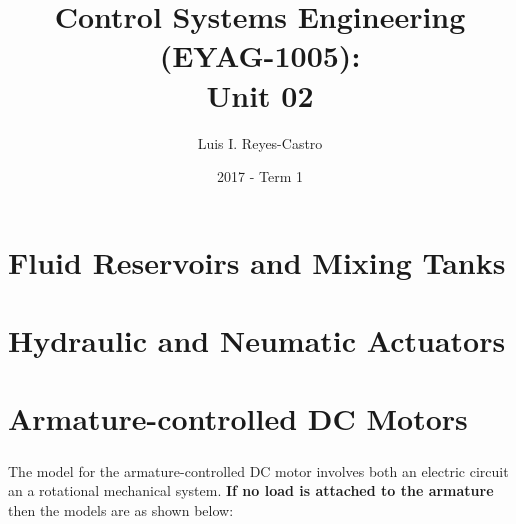 \documentclass[ 10pt, xcolor = dvipsnames]{beamer}
\title[\shorttitle]{Control Systems Engineering (EYAG-1005): \\ \textbf{Unit 02} }
\author[L. I. Reyes-Castro]{Luis I. Reyes-Castro}
\institute[ESPOL]{\normalsize Escuela Superior Polit\'ecnica del Litoral (ESPOL) \\ Guayaquil - Ecuador}
\date[2017-T1]{2017 - Term 1}
\begin{document}



\section{Fluid Reservoirs and Mixing Tanks}

\section{Hydraulic and Neumatic Actuators}

\section{Armature-controlled DC Motors}

\begin{frame}[allowframebreaks]
\frametitle{\insertsection}

The model for the armature-controlled DC motor involves both an electric circuit an a rotational mechanical system. \textbf{If no load is attached to the armature} \linebreak then the models are as shown below: 
\halfskip

\begin{figure}[htb]
\centering
\def\svgwidth{0.9\columnwidth}

\end{figure}

\end{frame}
\end{document}
